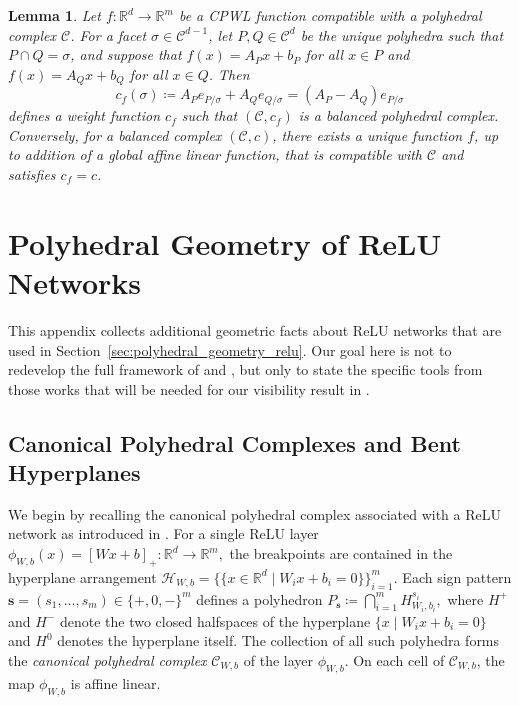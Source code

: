 \documentclass{article}
\newtheorem{lemma}[theorem]{Lemma}
\theoremstyle{definition}
\newcommand{\R}{\mathbb{R}}
\newcommand{\complex}{\mathcal{C}}
\begin{document}
\begin{lemma}
\label{lem:APP:structure_theorem_tropical_geometry}
   Let $f \colon \R^d \to \R^m$ be a CPWL function compatible with a polyhedral complex $\complex$. 
   For a facet $\sigma \in \complex^{d-1}$, let $P,Q \in \complex^d$ be the unique polyhedra such that $P \cap Q = \sigma$, 
   and 
   suppose that $f(x) = A_Px + b_P$ for all $x \in P$ and $f(x) = A_Qx + b_Q$ for all $x \in Q$. 
   Then 
   \[
   c_f(\sigma)  \coloneqq A_{P} e_{P/\sigma} +  A_{Q} e_{Q/\sigma} =  (A_{P} - A_{Q})e_{P/\sigma} 
   \]
 defines a weight function $c_f$ such that $(\complex,c_f)$ is a balanced polyhedral complex. Conversely,  for  a balanced complex $(\complex,c)$, there exists a unique function $f$, up to addition of a global affine linear function, that is compatible with $\complex$ and satisfies $c_f=c$.
\end{lemma}


\section{Polyhedral Geometry of ReLU Networks}
\label{app:relu_geometry}

This appendix collects additional geometric facts about ReLU networks that are used in
Section~\ref{sec:polyhedral_geometry_relu}. Our goal here is not to redevelop the full framework of
\cite{rolnick2020reverse,grigsby2023hiddensymmetriesrelunetworks} and \cite{grillo2026relunetworksadmitidentifiable}, but only to state the specific tools
from those works that will be needed for our visibility result in .

\subsection{Canonical Polyhedral Complexes and Bent Hyperplanes} 
\label{app:canonical_complex}

We begin by recalling the canonical polyhedral complex associated with a ReLU network as introduced in \cite{doi:10.1137/20M1368902}.
For a single ReLU layer
$
\phi_{W,b}(x)=[Wx+b]_+ \colon \R^d\to\R^m,
$
the breakpoints are contained in the hyperplane arrangement
$
\mathcal{H}_{W,b}
=
\bigl\{
\{x\in\R^d \mid W_ix+b_i=0\}
\bigr\}_{i=1}^m.
$
Each sign pattern $\mathbf{s}=(s_1,\dots,s_m)\in\{+,0,-\}^m$ defines a polyhedron
$
P_{\mathbf{s}}
\coloneqq
\bigcap_{i=1}^m H^{s_i}_{W_i,b_i},
$
where $H^+$ and $H^-$ denote the two closed halfspaces of the hyperplane
$\{x\mid W_ix+b_i=0\}$ and $H^0$ denotes the hyperplane itself.
The collection of all such polyhedra forms the \emph{canonical polyhedral complex}
$\complex_{W,b}$ of the layer $\phi_{W,b}$.
On each cell of $\complex_{W,b}$, the map $\phi_{W,b}$ is affine linear.
\end{document}
